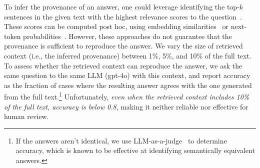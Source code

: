 To infer the provenance of an answer, one could leverage 
 identifying the top-$k$ sentences in the given text 
with the highest relevance scores to the question~\cite{sankararaman2024provenance,gao2023enabling,cohen2024contextcite}. 
These scores can be computed post hoc,
using embedding similarities~\cite{gao2023enabling} or next-token probabilities~\cite{cohen2024contextcite}.
However, these approaches do not guarantee
that the provenance is sufficient to reproduce the answer. 
 We vary the size of retrieved context (i.e., the inferred provenance) between 1\%, 5\%, and 10\% of the full text. 
To assess whether the retrieved context can reproduce the answer, we ask the same question to the same LLM (gpt-4o) with this context, and report accuracy as the fraction of cases where the resulting answer agrees with the one generated from the full text.\footnote{If the answers aren't identical, we use LLM-as-a-judge~\cite{gu2024survey,zheng2023judging} to determine accuracy, which is known to be effective at identifying semantically equivalent answers.} Unfortunately, {\em even when the retrieved context includes 10\% of the full text, accuracy is below 0.8}, making it neither reliable nor effective for human review. 





